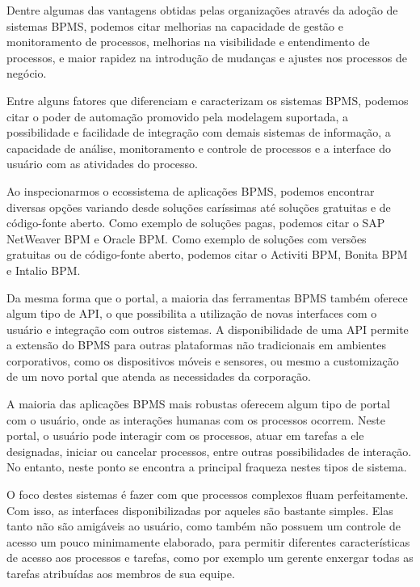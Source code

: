 Dentre algumas das vantagens obtidas pelas organizações através da adoção de sistemas BPMS, podemos citar melhorias na capacidade de gestão e monitoramento de processos, melhorias na visibilidade e entendimento de processos, e maior rapidez na introdução de mudanças e ajustes nos processos de negócio.

Entre alguns fatores que diferenciam e caracterizam os sistemas BPMS, podemos citar o poder de automação promovido pela modelagem suportada, a possibilidade e facilidade de integração com demais sistemas de informação, a capacidade de análise, monitoramento e controle de processos e a interface do usuário com as atividades do processo.

Ao inspecionarmos o ecossistema de aplicações BPMS, podemos encontrar diversas opções variando desde soluções caríssimas até soluções gratuitas e de código-fonte aberto. Como exemplo de soluções pagas, podemos citar o SAP NetWeaver BPM\cite{bpm_sap} e Oracle BPM\cite{bpm_oracle}. Como exemplo de soluções com versões gratuitas ou de código-fonte aberto, podemos citar o Activiti BPM\cite{bpm_activiti}, Bonita BPM\cite{bpm_bonita} e Intalio BPM\cite{bpm_intalio}.

Da mesma forma que o portal, a maioria das ferramentas BPMS também oferece algum tipo de API, o que possibilita a utilização de novas interfaces com o usuário e integração com outros sistemas. A disponibilidade de uma API permite a extensão do BPMS para outras plataformas não tradicionais em ambientes corporativos, como os dispositivos móveis e sensores, ou mesmo a customização de um novo portal que atenda as necessidades da corporação.

A maioria das aplicações BPMS mais robustas oferecem algum tipo de portal com o usuário, onde as interações humanas com os processos ocorrem. Neste portal, o usuário pode interagir com os processos, atuar em tarefas a ele designadas, iniciar ou cancelar processos, entre outras possibilidades de interação. No entanto, neste ponto se encontra a principal fraqueza nestes tipos de sistema.

O foco destes sistemas é fazer com que processos complexos fluam perfeitamente. Com isso, as interfaces disponibilizadas por aqueles são bastante simples. Elas tanto não são amigáveis ao usuário, como também não possuem um controle de acesso um pouco minimamente elaborado, para permitir diferentes características de acesso aos processos e tarefas, como por exemplo um gerente enxergar todas as tarefas atribuídas aos membros de sua equipe.
